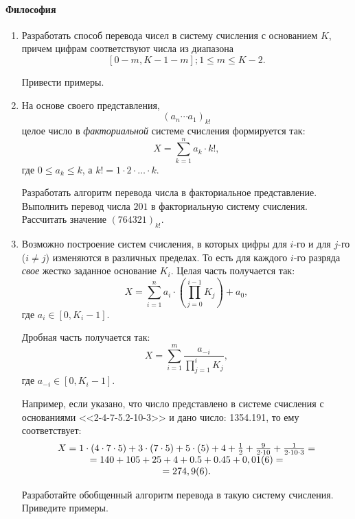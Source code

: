\paragraph{Философия}
\begin{enumerate}
    \item Разработать способ перевода чисел в систему счисления с основанием $K$, причем цифрам соответствуют числа из диапазона 
    \[[0-m,K-1-m]; 1\leq m \leq K-2.\] 

    Привести примеры.
    
    \item На основе своего представления, 
    \[
        (a_n\cdots a_1)_{k!}
    \]
    целое число в \emph{факториальной} системе счисления формируется так:
    \[
        X = \sum_{k=1}^{n}a_k\cdot{k!},
    \]
    где $0\leq a_k\leq k$, а $k!=1\cdot 2\cdot \ldots \cdot k$.
    
    Разработать алгоритм перевода числа в факториальное представление. Выполнить перевод числа $201$ в факториальную систему счисления. Рассчитать значение $(764321)_{k!}$.
    
    \item Возможно построение систем счисления, в которых цифры для $i$-го и для $j$-го ($i\neq j$) изменяются в различных пределах. То есть для каждого $i$-го разряда \emph{свое} жестко заданное основание $K_i$. Целая часть получается так:
    \[X=\sum_{i=1}^{n}a_{i}\cdot \left(\prod_{j=0}^{i-1} K_{j} \right)+a_0,\]
    где $a_i\in[0,K_{i}-1]$.

    Дробная часть получается так:
    \[X=\sum_{i=1}^{m}\frac{a_{-i}}{\displaystyle \prod_{j=1}^{i} K_{j}},\]
    где $a_{-i}\in[0,K_{i}-1]$.

    Например, если указано, что число представлено в системе счисления с основаниями <<2-4-7-5.2-10-3>> и дано число: 1354.191, то ему соответствует:
    \[
    \begin{array}[c]{c}
    X=1\cdot(4\cdot 7\cdot 5) + 3\cdot (7\cdot 5) + 5\cdot (5) + 4 + \frac{1}{2}+\frac{9}{2\cdot 10} + \frac{1}{2\cdot 10\cdot 3} =\\
    = 140 + 105 + 25 + 4 + 0.5 + 0.45 + 0,01(6) = \\
    = 274,9(6).
    \end{array}
    \]

    Разработайте обобщенный алгоритм перевода в такую систему счисления. Приведите примеры.

\end{enumerate}

